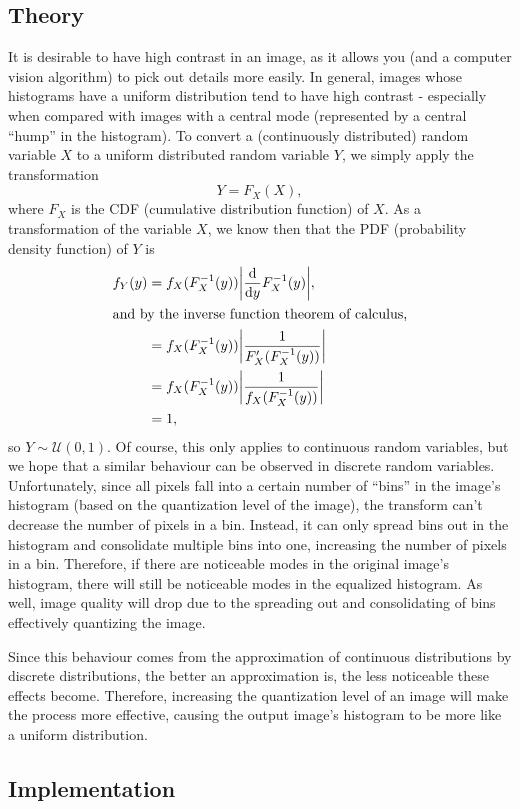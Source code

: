 \documentclass[headings=optiontoheadandtoc,listof=totoc,parskip=full]{scrartcl}
\begin{document}
\subsection{Theory}
\label{sec:equalization-theory}
It is desirable to have high contrast in an image, as it allows you (and a computer vision algorithm) to pick out details more easily. In general, images whose histograms have a uniform distribution tend to have high contrast - especially when compared with images with a central mode (represented by a central ``hump'' in the histogram). To convert a (continuously distributed) random variable $X$ to a uniform distributed random variable $Y$, we simply apply the transformation \[
	Y = F_X(X),
\] where $F_X$ is the CDF (cumulative distribution function) of $X$. As a transformation of the variable $X$, we know then that the PDF (probability density function) of $Y$ is
\begin{align*}
	f_Y(y) &= f_X(F_X^{-1}(y)) \abs{\dv{y} F_X^{-1}(y)},\\
\intertext{and by the inverse function theorem of calculus,}
		&= f_X(F_X^{-1}(y)) \abs{\frac{1}{F_X'(F_X^{-1}(y))}}\\
		&= f_X(F_X^{-1}(y)) \abs{\frac{1}{f_X(F_X^{-1}(y))}}\\
		&= 1,
\end{align*}
so $Y \sim \mathcal U(0, 1)$. Of course, this only applies to continuous random variables, but we hope that a similar behaviour can be observed in discrete random variables. Unfortunately, since all pixels fall into a certain number of ``bins'' in the image's histogram (based on the quantization level of the image), the transform can't decrease the number of pixels in a bin. Instead, it can only spread bins out in the histogram and consolidate multiple bins into one, increasing the number of pixels in a bin. Therefore, if there are noticeable modes in the original image's histogram, there will still be noticeable modes in the equalized histogram. As well, image quality will drop due to the spreading out and consolidating of bins effectively quantizing the image.

Since this behaviour comes from the approximation of continuous distributions by discrete distributions, the better an approximation is, the less noticeable these effects become. Therefore, increasing the quantization level of an image will make the process more effective, causing the output image's histogram to be more like a uniform distribution.

\subsection{Implementation}
\label{sec:equalization-implementation}
\end{document}
